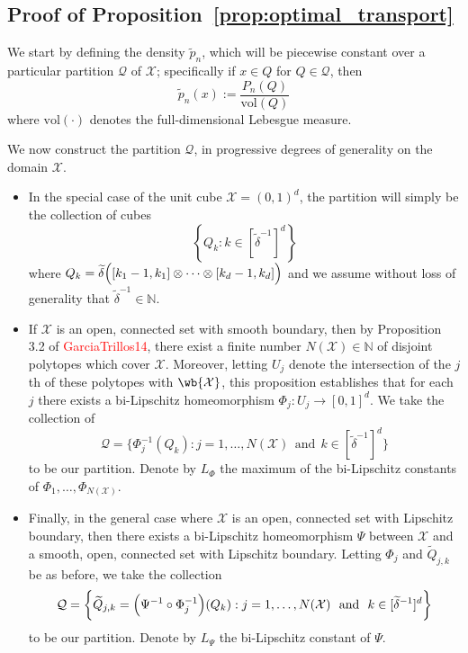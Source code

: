 \documentclass{article}
\newcommand{\set}[1]{\left\{#1\right\}}
\newcommand{\vol}{\text{vol}}
\newcommand{\1}{\mathbf{1}}
\newcommand{\Xset}{\mathcal{X}}
\newcommand{\mc}[1]{\mathcal{#1}}
\newcommand{\wt}[1]{\widetilde{#1}}
\theoremstyle{alden}
\theoremstyle{aldenthm}
\theoremstyle{definition}
\theoremstyle{remark}
\begin{document}
\subsection{Proof of Proposition~\ref{prop:optimal_transport}}
\label{subsec:proof_proposition_optimal_transport}

We start by defining the density $\wt{p}_n$, which will be piecewise constant over a particular partition $\mc{Q}$ of $\Xset$; specifically if $x \in Q$ for $Q \in \mc{Q}$, then
\begin{equation}
\label{pf:prop_optimal_transport_0}
\wt{p}_n(x) := \frac{P_n(Q)}{\vol(Q)}
\end{equation}
where $\vol(\cdot)$ denotes the full-dimensional Lebesgue measure. 

We now construct the partition $\mc{Q}$, in progressive degrees of generality on the domain $\Xset.$
\begin{itemize}
	\item In the special case of the unit cube $\Xset = (0,1)^d$, the partition will simply be the collection of cubes
	\begin{equation*}
	\set{Q_k: k \in [\wt{\delta}^{-1}]^d} 
	\end{equation*}
	where $Q_k = \wt{\delta}\Bigl([k_1 - 1,k_1] \otimes \cdots \otimes [k_d - 1,k_d]\Bigr)$ and we assume without loss of generality that $\wt{\delta}^{-1} \in \mathbb{N}$.
	\item If $\mc{\Xset}$ is an open, connected set with smooth boundary, then by Proposition 3.2 of \textcolor{red}{GarciaTrillos14}, there exist a finite number $N(\Xset) \in \mathbb{N}$ of disjoint polytopes which cover $\Xset$. Moreover, letting $U_j$ denote the intersection of the $j$th of these polytopes with $\wb{\Xset}$, this proposition establishes that for each $j$ there exists a bi-Lipschitz homeomorphism $\Phi_j: U_j \to [0,1]^d$. We take the collection of
	\begin{equation*}
	\mc{Q} = \biggl\{\Phi_j^{-1}(Q_k): j = 1,\ldots,N(\Xset)~~\textrm{and}~~k \in [\wt{\delta}^{-1}]^d\biggr\}
	\end{equation*}
	to be our partition. Denote by $L_{\Phi}$ the maximum of the bi-Lipschitz constants of $\Phi_1,\ldots,\Phi_{N(\Xset)}$.
	\item Finally, in the general case where $\Xset$ is an open, connected set with Lipschitz boundary, then there exists a bi-Lipschitz homeomorphism $\Psi$ between $\Xset$ and a smooth, open, connected set with Lipschitz boundary. Letting $\Phi_j$ and $\wt{Q}_{j,k}$ be as before, we take the collection
	\begin{equation*}
	\mc{Q} = \biggl\{\wt{Q}_{j,k} = \Bigl(\Psi^{-1} \circ \Phi_j^{-1}\Bigr)(Q_k): j = 1,\ldots,N(\Xset)~~\textrm{and}~~k \in [\wt{\delta}^{-1}]^d\biggr\}
	\end{equation*}
	to be our partition. Denote by $L_{\Psi}$ the bi-Lipschitz constant of $\Psi$.
\end{itemize}
\end{document}
